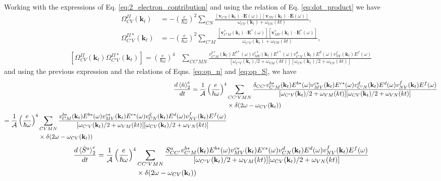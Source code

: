 \documentclass{article}
\newcommand{\kt}{\mathbf{k}_{t}}
\newcommand{\dw}{\delta(2\omega - \omega_{CV}(\kt))}
\begin{document}
Working with the expressions of Eq.
\eqref{eq:2_electron_contribution} and using the relation of Eq.
\eqref{eq:dot_product} we have
\begin{align*}\label{eq:omegaICV_omegaI*CpV}
\Omega^{II}_{CV}(\kt) &= - \left(\frac{e}{\hbar\omega}\right)^{2}
\sum_{CN} \frac{[\mathbf{v}_{CN}(\kt) \cdot \mathbf{E}(\omega)]
[\mathbf{v}_{NV}(\kt)\cdot\mathbf{E}(\omega)]}{\omega_{CV}(\kt)+\omega_{VN}(kt)},\\
\Omega^{II*}_{C'V}(\kt) &= - \left(\frac{e}{\hbar\omega}\right)^{2}
\sum_{C'M} \frac{[\mathbf{v}^{*}_{C'M}(\kt) \cdot \mathbf{E}^{*}(\omega)]
[\mathbf{v}^{*}_{MV}(\kt)\cdot\mathbf{E}^{*}(\omega)]}{\omega_{C'V}(\kt)+\omega_{VM}(kt)}, \\
\end{align*}
\begin{equation}\label{eq:omegaII*CpV_omegaIICV_product}
\begin{split}
[\Omega^{II}_{CV}(\kt)\Omega^{II*}_{C'V}(\kt)] = \left(\frac{e}{\hbar\omega}\right)^{4} &
\sum_{CC'MN} \frac{v^{b*}_{C'M}(\kt) E^{b*}(\omega)v^{c*}_{MV}(\kt) E^{c*}(\omega)
v^{d}_{C'N}(\kt) E^{d}(\omega)v^{f}_{NV}(\kt) E^{f}(\omega)}
{[\omega_{C'V}(\kt)/2+\omega_{VM}(kt)][\omega_{CV}(\kt)/2+\omega_{VN}(kt)]}
\end{split}
\end{equation}
and using the previous expression and the relations of Eqns. \eqref{eq:op_n} and
\eqref{eq:op_S}, we have 
\begin{align}
\frac{d\ev*{\hat{n}}^{e}_2}{dt} = \frac{1}{\mathcal{A}} \left(\frac{e}{\hbar\omega}\right)^{4}&
\sum_{CC'VMN} \frac{\delta_{CC'} v^{b*}_{C'M}(\kt) E^{b*}(\omega)v^{c*}_{MV}(\kt) E^{c*}(\omega)
v^{d}_{C'N}(\kt) E^{d}(\omega)v^{f}_{NV}(\kt) E^{f}(\omega)}
{[\omega_{C'V}(\kt)/2+\omega_{VM}(kt)][\omega_{CV}(\kt)/2+\omega_{VN}(kt)]} \nonumber \\
& \times \dw \nonumber \\
\begin{split}
= \frac{1}{\mathcal{A}} \left(\frac{e}{\hbar\omega}\right)^{4} &
\sum_{CVMN} \frac{v^{b*}_{CM}(\kt) E^{b*}(\omega)v^{c*}_{MV}(\kt) E^{c*}(\omega)
v^{d}_{CN}(\kt) E^{d}(\omega)v^{f}_{NV}(\kt) E^{f}(\omega)}
{[\omega_{C'V}(\kt)/2+\omega_{VM}(kt)][\omega_{CV}(\kt)/2+\omega_{VN}(kt)]} \\
& \times \dw \label{eq:2w_n_final}
\end{split}
\end{align}
\begin{equation}\label{eq:2w_S_final}
\begin{split}
\frac{d\ev*{\hat{S}^{a}}^{e}_2}{dt}= \frac{1}{\mathcal{A}} \left(\frac{e}{\hbar\omega}\right)^{4} &
\sum_{CC'VMN} \frac{S^{a}_{CC'} v^{b*}_{C'M}(\kt) E^{b*}(\omega)v^{c*}_{MV}(\kt) E^{c*}(\omega)
v^{d}_{CN}(\kt) E^{d}(\omega)v^{f}_{NV}(\kt) E^{f}(\omega)}
{[\omega_{C'V}(\kt)/2+\omega_{VM}(kt)][\omega_{CV}(\kt)/2+\omega_{VN}(kt)]} \\
& \times \dw 
\end{split}
\end{equation}
\end{document}
